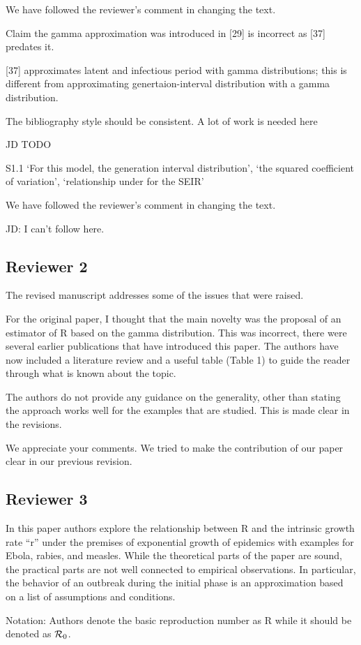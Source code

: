 \documentclass[12pt]{article}
\newcommand{\Rx}[1]{\ensuremath{{\cal R}_{#1}}}
\newcommand{\Ro}{\Rx{0}}
\newcommand{\rev}{\subsection*}
\newcommand{\revtext}{\textsf}
\begin{document}
We have followed the reviewer's comment in changing the text.

\revtext{Claim the gamma approximation was introduced in [29] is incorrect as [37] predates it.}

[37] approximates latent and infectious period with gamma distributions; this is different from approximating genertaion-interval distribution with a gamma distribution.

\revtext{The bibliography style should be consistent. A lot of work is needed here}

JD TODO

\revtext{S1.1 ‘For this model, the generation interval distribution’, ‘the squared coefficient of variation’, ‘relationship under for the SEIR’}

We have followed the reviewer's comment in changing the text. 

JD: I can't follow here.

\rev{Reviewer 2}

\revtext{The revised manuscript addresses some of the issues that were raised.}

\revtext{For the original paper, I thought that the main novelty was the
proposal of an estimator of R based on the gamma distribution. This
was incorrect, there were several earlier publications that have
introduced this paper. The authors have now included a literature
review and a useful table (Table 1) to guide the reader through what
is known about the topic.}

\revtext{The authors do not provide any guidance on the generality, other than
stating the approach works well for the examples that are studied.
This is made clear in the revisions.}

We appreciate your comments. We tried to make the contribution of our paper clear in our previous revision.

\rev{Reviewer 3}

\revtext{In this paper authors explore the relationship between R and the
intrinsic growth rate ``r'' under the premises of exponential growth of
epidemics with examples for Ebola, rabies, and measles. While the
theoretical parts of the paper are sound, the practical parts are not
well connected to empirical observations. In particular, the behavior
of an outbreak during the initial phase is an approximation based on a
list of assumptions and conditions.}

\revtext{Notation: Authors denote the basic reproduction number as R while it should be denoted as \Ro.}
\end{document}
